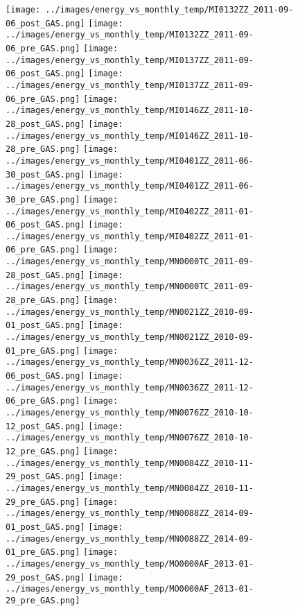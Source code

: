 \clearpage
\begin{figure}
\centering
\texttt{[image: ../images/energy\_vs\_monthly\_temp/MI0132ZZ\_2011-09-06\_post\_GAS.png]}
\texttt{[image: ../images/energy\_vs\_monthly\_temp/MI0132ZZ\_2011-09-06\_pre\_GAS.png]}
\texttt{[image: ../images/energy\_vs\_monthly\_temp/MI0137ZZ\_2011-09-06\_post\_GAS.png]}
\texttt{[image: ../images/energy\_vs\_monthly\_temp/MI0137ZZ\_2011-09-06\_pre\_GAS.png]}
\texttt{[image: ../images/energy\_vs\_monthly\_temp/MI0146ZZ\_2011-10-28\_post\_GAS.png]}
\texttt{[image: ../images/energy\_vs\_monthly\_temp/MI0146ZZ\_2011-10-28\_pre\_GAS.png]}
\texttt{[image: ../images/energy\_vs\_monthly\_temp/MI0401ZZ\_2011-06-30\_post\_GAS.png]}
\texttt{[image: ../images/energy\_vs\_monthly\_temp/MI0401ZZ\_2011-06-30\_pre\_GAS.png]}
\texttt{[image: ../images/energy\_vs\_monthly\_temp/MI0402ZZ\_2011-01-06\_post\_GAS.png]}
\texttt{[image: ../images/energy\_vs\_monthly\_temp/MI0402ZZ\_2011-01-06\_pre\_GAS.png]}
\texttt{[image: ../images/energy\_vs\_monthly\_temp/MN0000TC\_2011-09-28\_post\_GAS.png]}
\texttt{[image: ../images/energy\_vs\_monthly\_temp/MN0000TC\_2011-09-28\_pre\_GAS.png]}
\texttt{[image: ../images/energy\_vs\_monthly\_temp/MN0021ZZ\_2010-09-01\_post\_GAS.png]}
\texttt{[image: ../images/energy\_vs\_monthly\_temp/MN0021ZZ\_2010-09-01\_pre\_GAS.png]}
\texttt{[image: ../images/energy\_vs\_monthly\_temp/MN0036ZZ\_2011-12-06\_post\_GAS.png]}
\texttt{[image: ../images/energy\_vs\_monthly\_temp/MN0036ZZ\_2011-12-06\_pre\_GAS.png]}
\texttt{[image: ../images/energy\_vs\_monthly\_temp/MN0076ZZ\_2010-10-12\_post\_GAS.png]}
\texttt{[image: ../images/energy\_vs\_monthly\_temp/MN0076ZZ\_2010-10-12\_pre\_GAS.png]}
\texttt{[image: ../images/energy\_vs\_monthly\_temp/MN0084ZZ\_2010-11-29\_post\_GAS.png]}
\texttt{[image: ../images/energy\_vs\_monthly\_temp/MN0084ZZ\_2010-11-29\_pre\_GAS.png]}
\texttt{[image: ../images/energy\_vs\_monthly\_temp/MN0088ZZ\_2014-09-01\_post\_GAS.png]}
\texttt{[image: ../images/energy\_vs\_monthly\_temp/MN0088ZZ\_2014-09-01\_pre\_GAS.png]}
\texttt{[image: ../images/energy\_vs\_monthly\_temp/MO0000AF\_2013-01-29\_post\_GAS.png]}
\texttt{[image: ../images/energy\_vs\_monthly\_temp/MO0000AF\_2013-01-29\_pre\_GAS.png]}
\end{figure}
